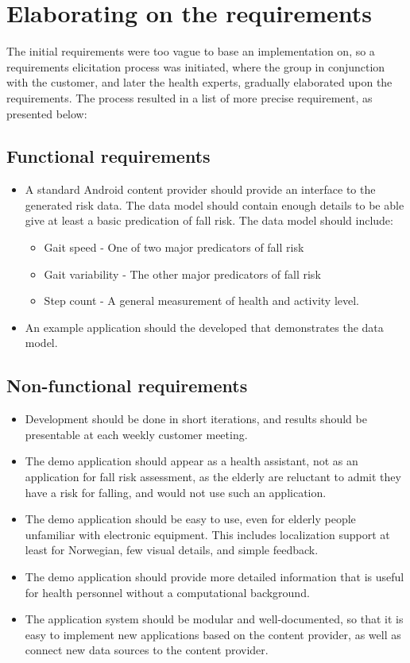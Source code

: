 \section{Elaborating on the requirements}
The initial requirements were too vague to base an implementation on, so a requirements elicitation process was initiated, where the group in conjunction with the customer, and later the health experts, gradually elaborated upon the requirements. The process resulted in a list of more precise requirement, as presented below:

\subsection{Functional requirements}
\begin{itemize}
\item A standard Android content provider should provide an interface to the generated risk data. The data model should contain enough details to be able give at least a basic predication of fall risk. The data model should include:
\begin{itemize}
\item Gait speed - One of two major predicators of fall risk
\item Gait variability - The other major predicators of fall risk
\item Step count - A general measurement of health and activity level.
\end{itemize}
\item An example application should the developed that demonstrates the data model.
\end{itemize}	

\subsection{Non-functional requirements}
\begin{itemize}
\item Development should be done in short iterations, and results should be presentable at each weekly customer meeting.
\item The demo application should appear as a health assistant, not as an application for fall risk assessment, as the elderly are reluctant to admit they have a risk for falling, and would not use such an application.
\item The demo application should be easy to use, even for elderly people unfamiliar with electronic equipment. This includes localization support at least for Norwegian, few visual details, and simple feedback.
\item The demo application should provide more detailed information that is useful for health personnel without a computational background.
\item The application system should be modular and well-documented, so that it is easy to implement new applications based on the content provider, as well as connect new data sources to the content provider.
\end{itemize}

